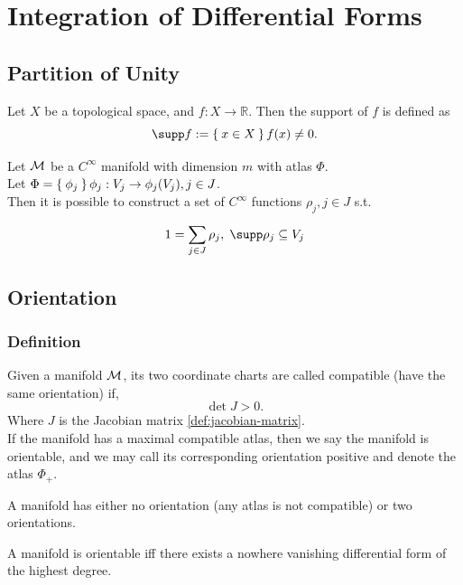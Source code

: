 \documentclass[../main.tex]{subfiles}
\begin{document}
    \section{Integration of Differential Forms}
    \subsection{Partition of Unity}
    \begin{definition}[Support]\label{def:support}
        Let \(X\) be a topological space, and \(f : X \to \mathbb{R}\). Then 
        the support of \(f\) is defined as
        \[
        \supp f := \Set{x \in X}{f(x) \neq 0}.
        \]
    \end{definition}
    \begin{theorem}\label{thm:manifold-partition-of-unity}
        Let \(\manifold[M]\) be a \(C^\infty\) manifold with dimension \(m\) with 
        atlas \(\Phi\). \\
        Let \(\Phi = \Set{\phi_j}{\phi_j : V_j \to \phi_j(V_j), j \in J}\).\\
        Then it is possible to construct a set of \(C^\infty\) functions 
        \(\rho_j, j \in J\) s.t. 
        \[
        1 = \sum_{j \in J}^{} \rho_j,\; \supp \rho_j \subseteq V_j
        \]
    \end{theorem}
    \subsection{Orientation}
    \subsubsection{Definition}
    \begin{definition}\label{def:compatible-coord-charts}
        Given a manifold \(\manifold[M]\), its two coordinate charts are called 
        compatible (have the same orientation) if, 
        \[
        \det J > 0.
        \]
        Where \(J\) is the Jacobian matrix \cref{def:jacobian-matrix}.\\
        If the manifold has a maximal compatible atlas, then we say the manifold is 
        orientable, and we may call its corresponding 
        orientation positive and denote the atlas \(\Phi_+\).
    \end{definition}
    \begin{theorem}
        A manifold has either no orientation (any atlas is not compatible) or 
        two orientations.
    \end{theorem}
    \begin{theorem}\label{thm:volume-form-orientability}
        A manifold is orientable iff there exists a nowhere vanishing differential 
        form of the highest degree.
    \end{theorem}
\end{document}
